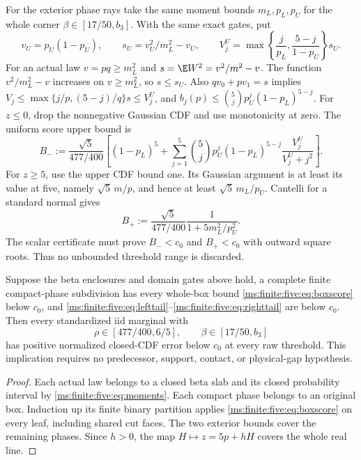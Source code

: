 For the exterior phase rays take the same moment bounds $m_L,p_L,p_U$
for the whole corner $\beta\in[17/50,b_3]$. With the same exact gates,
put
\[
 v_U=p_U(1-p_U),\qquad s_U=v_U^2/m_L^2-v_U,\qquad
 V_j^U=\max\left\{\frac j{p_L},\frac{5-j}{1-p_U}\right\}s_U.
\]
For an actual law $v=pq\ge m_L^2$ and
$s=\E W^2=v^2/m^2-v$. The function $v^2/m_L^2-v$ increases on
$v\ge m_L^2$, so $s\le s_U$. Also $qv_0+pv_1=s$ implies
$V_j\le\max\{j/p,(5-j)/q\}s\le V_j^U$, and
$b_j(p)\le\binom5j p_U^j(1-p_L)^{5-j}$.
For $z\le0$, drop the nonnegative Gaussian CDF and use monotonicity
at zero. The uniform score upper bound is
\begin{equation}\label{ms:finite:five:eq:lefttail}
 B_-:=\frac{\sqrt5}{477/400}
 \left[(1-p_L)^5+\sum_{j=1}^5\binom5j p_U^j(1-p_L)^{5-j}
             \frac{V_j^U}{V_j^U+j^2}\right].
\end{equation}
For $z\ge5$, use the upper CDF bound one. Its Gaussian argument is
at least its value at five, namely $\sqrt5\,m/p$, and hence at least
$\sqrt5\,m_L/p_U$. Cantelli for a standard normal gives
\begin{equation}\label{ms:finite:five:eq:righttail}
 B_+:=\frac{\sqrt5}{477/400}\frac1{1+5m_L^2/p_U^2}.
\end{equation}
The scalar certificate must prove $B_-<c_0$ and $B_+<c_0$ with
outward square roots. Thus no unbounded threshold range is discarded.

\begin{proposition}
\label{ms:finite:five:prop:gapfree}
Suppose the beta enclosures and domain gates above hold, a complete
finite compact-phase subdivision has every whole-box bound
\eqref{ms:finite:five:eq:boxscore} below $c_0$, and
\eqref{ms:finite:five:eq:lefttail}--\eqref{ms:finite:five:eq:righttail} are below $c_0$.
Then every standardized iid marginal with
\[
 \rho\in[477/400,6/5],\qquad\beta\in[17/50,b_3]
\]
has positive normalized closed-CDF error below $c_0$ at every raw
threshold. This implication requires no predecessor, support, contact,
or physical-gap hypothesis.
\end{proposition}
\begin{proof}
Each actual law belongs to a closed beta slab and its closed probability
interval by \eqref{ms:finite:five:eq:moments}. Each compact phase belongs to an
original box. Induction up its finite binary partition applies
\eqref{ms:finite:five:eq:boxscore} on every leaf, including shared cut faces.
The two exterior bounds cover the remaining phases. Since
$h>0$, the map $H\mapsto z=5p+hH$ covers the whole real line.
\end{proof}

